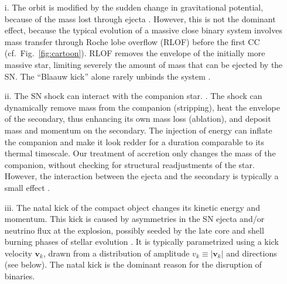 \documentclass{aa}
\DeclareRobustCommand{\Figref}[1]{Fig.~\ref{#1}}
\begin{document}
\begin{enumerate}
\item[i.] The orbit is modified by the sudden change in gravitational potential, because
of the mass lost through ejecta \citep[the so-called ``Blaauw
kick'',][]{zwicky:57,blaauw:61, boersma:61}. However, this is not the
dominant effect, because the typical evolution of a massive close binary
system involves mass transfer through Roche lobe overflow (RLOF) before the first CC (cf.~\Figref{fig:cartoon}). RLOF
removes the envelope of the initially more massive star, limiting
severely the amount of mass that can be ejected by the SN. The
``Blaauw kick'' alone rarely unbinds the system \citep[][]{huang:63,tutukov:73,leonard:94}.
\item[ii.] The SN shock can interact with the companion star.
  \citep[e.g.,][]{wheeler:75,liu:15, rimoldi:16, hirai:18}. The shock can dynamically
  remove mass from the companion (stripping), heat the envelope of the
  secondary, thus enhancing its own mass
  loss (ablation), and deposit mass and momentum on the secondary. The injection of energy can inflate the companion and make
  it look redder for a duration comparable to its thermal timescale. Our
  treatment of accretion only changes the mass of the companion, without
  checking for structural readjustments of the star. However, the
  interaction between the ejecta and the secondary is typically a small effect \citep[e.g.,][]{liu:15}.
\item[iii.]  The natal kick of the compact object changes %
  its kinetic energy and momentum. This kick is caused by asymmetries
  in the SN ejecta and/or neutrino flux at the explosion, possibly
  seeded by the late core and shell burning phases of stellar
  evolution \citep[see e.g.,][]{shklovskii:70,kusenko:96,fryer:04,socrates:05,wongwathanarat:13,
    janka:13,janka:17,holland-ashford:17,grefenstette:17,katsuda:18}. It
is typically parametrized using a kick velocity $\mathbf{v}_k$, drawn
from a distribution of amplitude $v_k\equiv |\mathbf{v}_k|$ and directions (see below). The natal
kick is the dominant reason for the disruption of binaries.
\end{enumerate}
\end{document}
